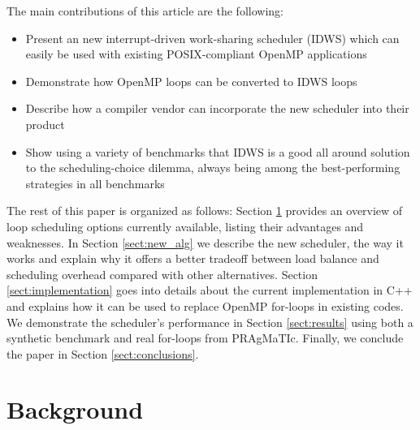 \documentclass{acm_proc_article-sp}
\newcommand{\PRAGMATIC}{PRAgMaTIc\xspace}
\begin{document}
The main contributions of this article are the following:
\begin{itemize}
\item Present an new interrupt-driven work-sharing scheduler (IDWS) which can
easily be used with existing POSIX-compliant OpenMP applications
\item Demonstrate how OpenMP loops can be converted to IDWS loops
\item Describe how a compiler vendor can incorporate the new scheduler into
their product
\item Show using a variety of benchmarks that IDWS is a good all around solution
to the scheduling-choice dilemma, always being among the best-performing
strategies in all benchmarks
\end{itemize}

The rest of this paper is organized as follows: Section \ref{sect:background} 
provides an overview of loop scheduling options currently available, listing 
their advantages and weaknesses. In Section \ref{sect:new_alg} we describe the 
new scheduler, the way it works and explain why it offers a better tradeoff 
between load balance and scheduling overhead compared with other alternatives. 
Section \ref{sect:implementation} goes into details about the current 
implementation in C++ and explains how it can be used to replace OpenMP 
for-loops in existing codes. We demonstrate the scheduler's performance in 
Section \ref{sect:results} using both a synthetic benchmark and real for-loops 
from \PRAGMATIC. Finally, we conclude the paper in Section 
\ref{sect:conclusions}.


\section{Background}
\label{sect:background}
\end{document}
